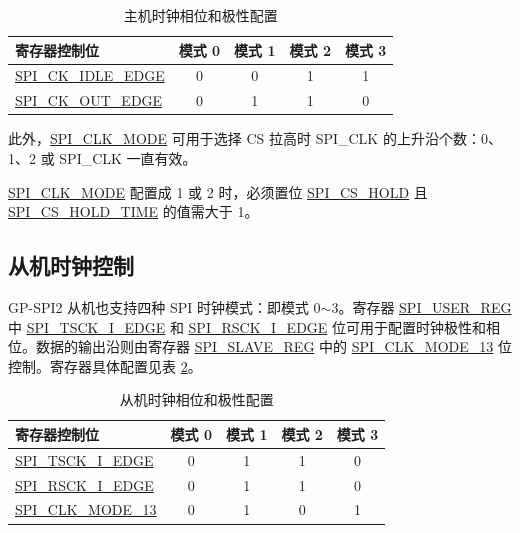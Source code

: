 \documentclass[main\_\_CN.tex]{subfiles}
\begin{document}
\begin{table}[H]
    \centering
    \caption{主机时钟相位和极性配置}
    \label{table:clock_pol_master}
    \begin{tabular}[c]{|p{3.5cm}|c|c|c|c|}
    \hline
    \rowcolor{lightgray}
    寄存器控制位 & 模式 0 & 模式 1 & 模式 2 & 模式 3\\
    \hline
   \hyperref[fielddesc:SPICKIDLEEDGE]{SPI\_CK\_IDLE\_EDGE}  & 0     & 0     & 1     & 1\\
    \hline
   \hyperref[fielddesc:SPICKOUTEDGE]{SPI\_CK\_OUT\_EDGE}   & 0     & 1     & 1     & 0\\
    \hline
    \end{tabular}
\end{table}

此外，\hyperref[fielddesc:SPICLKMODE]{SPI\_CLK\_MODE} 可用于选择 CS 拉高时 SPI\_CLK 的上升沿个数：0、1、2 或 SPI\_CLK 一直有效。

\begin{tiplisting}
 \hyperref[fielddesc:SPICLKMODE]{SPI\_CLK\_MODE} 配置成 1 或 2 时，必须置位 \hyperref[fielddesc:SPICSHOLD]{SPI\_CS\_HOLD} 且 \hyperref[fielddesc:SPICSHOLDTIME]{SPI\_CS\_HOLD\_TIME} 的值需大于 1。
\end{tiplisting}
\vspace{-1em}

\subsection{从机时钟控制}\label{GP-SPI2 slave clock control}

GP-SPI2 从机也支持四种 SPI 时钟模式：即模式 0$\sim$3。寄存器 \hyperref[regdesc:SPIUSERREG]{SPI\_USER\_REG} 中 \hyperref[fielddesc:SPITSCKIEDGE]{SPI\_TSCK\_I\_EDGE} 和 \hyperref[fielddesc:SPIRSCKIEDGE]{SPI\_RSCK\_I\_EDGE} 位可用于配置时钟极性和相位。数据的输出沿则由寄存器 \hyperref[regdesc:SPISLAVEREG]{SPI\_SLAVE\_REG} 中的 \hyperref[fielddesc:SPICLKMODE13]{SPI\_CLK\_MODE\_13} 位控制。寄存器具体配置见表  \ref{table:clock_pol_slave}。

\begin{table}[H]
    \centering
    \caption{从机时钟相位和极性配置}
    \label{table:clock_pol_slave}
    \begin{tabular}[c]{|p{3.5cm}|c|c|c|c|}
    \hline
    \rowcolor{lightgray}
    寄存器控制位 & 模式 0 & 模式 1 & 模式 2 & 模式 3\\
    \hline
   \hyperref[fielddesc:SPITSCKIEDGE]{SPI\_TSCK\_I\_EDGE}   & 0 & 1 & 1 & 0\\
    \hline
   \hyperref[fielddesc:SPIRSCKIEDGE]{SPI\_RSCK\_I\_EDGE}   & 0 & 1 & 1 & 0\\
    \hline
   \hyperref[fielddesc:SPICLKMODE13]{SPI\_CLK\_MODE\_13}     & 0 & 1 & 0 & 1\\
    \hline
    \end{tabular}
\end{table}
\end{document}
